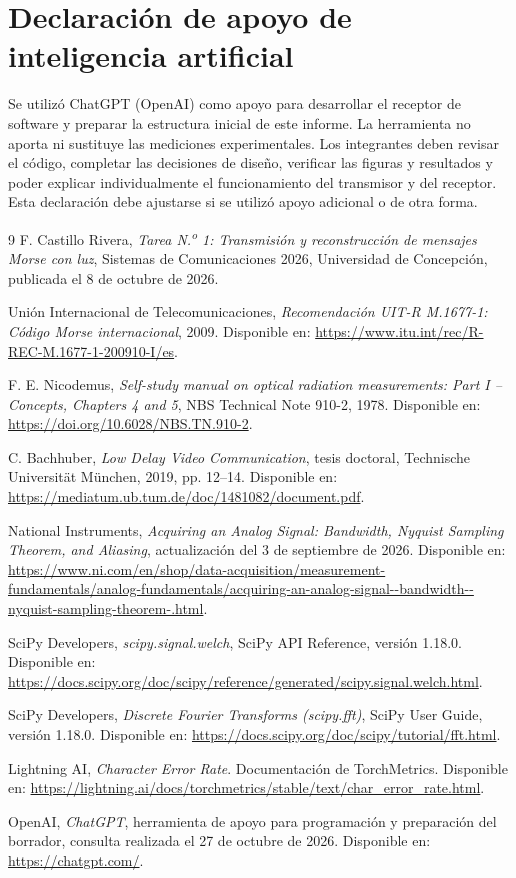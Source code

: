 \documentclass[11pt,a4paper]{article}
\begin{document}
\section{Declaración de apoyo de inteligencia artificial}
Se utilizó ChatGPT (OpenAI) como apoyo para desarrollar el receptor de software y preparar la estructura inicial de este informe. La herramienta no aporta ni sustituye las mediciones experimentales. Los integrantes deben revisar el código, completar las decisiones de diseño, verificar las figuras y resultados y poder explicar individualmente el funcionamiento del transmisor y del receptor. Esta declaración debe ajustarse si se utilizó apoyo adicional o de otra forma.

\begin{thebibliography}{9}
F. Castillo Rivera, \textit{Tarea N.\textsuperscript{o} 1: Transmisión y reconstrucción de mensajes Morse con luz}, Sistemas de Comunicaciones 2026, Universidad de Concepción, publicada el 8 de octubre de 2026.

Unión Internacional de Telecomunicaciones, \textit{Recomendación UIT-R M.1677-1: Código Morse internacional}, 2009. Disponible en: \url{https://www.itu.int/rec/R-REC-M.1677-1-200910-I/es}.

F. E. Nicodemus, \textit{Self-study manual on optical radiation measurements: Part I -- Concepts, Chapters 4 and 5}, NBS Technical Note 910-2, 1978. Disponible en: \url{https://doi.org/10.6028/NBS.TN.910-2}.

C. Bachhuber, \textit{Low Delay Video Communication}, tesis doctoral, Technische Universität München, 2019, pp. 12--14. Disponible en: \url{https://mediatum.ub.tum.de/doc/1481082/document.pdf}.

National Instruments, \textit{Acquiring an Analog Signal: Bandwidth, Nyquist Sampling Theorem, and Aliasing}, actualización del 3 de septiembre de 2026. Disponible en: \url{https://www.ni.com/en/shop/data-acquisition/measurement-fundamentals/analog-fundamentals/acquiring-an-analog-signal--bandwidth--nyquist-sampling-theorem-.html}.

SciPy Developers, \textit{scipy.signal.welch}, SciPy API Reference, versión 1.18.0. Disponible en: \url{https://docs.scipy.org/doc/scipy/reference/generated/scipy.signal.welch.html}.

SciPy Developers, \textit{Discrete Fourier Transforms (scipy.fft)}, SciPy User Guide, versión 1.18.0. Disponible en: \url{https://docs.scipy.org/doc/scipy/tutorial/fft.html}.

Lightning AI, \textit{Character Error Rate}. Documentación de TorchMetrics. Disponible en: \url{https://lightning.ai/docs/torchmetrics/stable/text/char_error_rate.html}.

OpenAI, \textit{ChatGPT}, herramienta de apoyo para programación y preparación del borrador, consulta realizada el 27 de octubre de 2026. Disponible en: \url{https://chatgpt.com/}.
\end{thebibliography}
\end{document}
